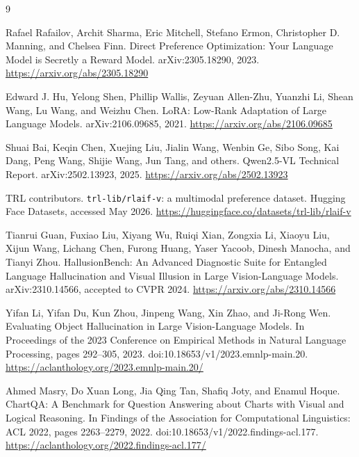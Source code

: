 \documentclass{article}
\begin{document}
\begin{thebibliography}{9}

Rafael Rafailov, Archit Sharma, Eric Mitchell, Stefano Ermon, Christopher D. Manning, and Chelsea Finn.
\newblock Direct Preference Optimization: Your Language Model is Secretly a Reward Model.
\newblock arXiv:2305.18290, 2023.
\newblock \url{https://arxiv.org/abs/2305.18290}

Edward J. Hu, Yelong Shen, Phillip Wallis, Zeyuan Allen-Zhu, Yuanzhi Li, Shean Wang, Lu Wang, and Weizhu Chen.
\newblock LoRA: Low-Rank Adaptation of Large Language Models.
\newblock arXiv:2106.09685, 2021.
\newblock \url{https://arxiv.org/abs/2106.09685}

Shuai Bai, Keqin Chen, Xuejing Liu, Jialin Wang, Wenbin Ge, Sibo Song, Kai Dang, Peng Wang, Shijie Wang, Jun Tang, and others.
\newblock Qwen2.5-VL Technical Report.
\newblock arXiv:2502.13923, 2025.
\newblock \url{https://arxiv.org/abs/2502.13923}

TRL contributors.
\newblock \texttt{trl-lib/rlaif-v}: a multimodal preference dataset.
\newblock Hugging Face Datasets, accessed May 2026.
\newblock \url{https://huggingface.co/datasets/trl-lib/rlaif-v}

Tianrui Guan, Fuxiao Liu, Xiyang Wu, Ruiqi Xian, Zongxia Li, Xiaoyu Liu, Xijun Wang, Lichang Chen, Furong Huang, Yaser Yacoob, Dinesh Manocha, and Tianyi Zhou.
\newblock HallusionBench: An Advanced Diagnostic Suite for Entangled Language Hallucination and Visual Illusion in Large Vision-Language Models.
\newblock arXiv:2310.14566, accepted to CVPR 2024.
\newblock \url{https://arxiv.org/abs/2310.14566}

Yifan Li, Yifan Du, Kun Zhou, Jinpeng Wang, Xin Zhao, and Ji-Rong Wen.
\newblock Evaluating Object Hallucination in Large Vision-Language Models.
\newblock In Proceedings of the 2023 Conference on Empirical Methods in Natural Language Processing, pages 292--305, 2023.
\newblock doi:10.18653/v1/2023.emnlp-main.20.
\newblock \url{https://aclanthology.org/2023.emnlp-main.20/}

Ahmed Masry, Do Xuan Long, Jia Qing Tan, Shafiq Joty, and Enamul Hoque.
\newblock ChartQA: A Benchmark for Question Answering about Charts with Visual and Logical Reasoning.
\newblock In Findings of the Association for Computational Linguistics: ACL 2022, pages 2263--2279, 2022.
\newblock doi:10.18653/v1/2022.findings-acl.177.
\newblock \url{https://aclanthology.org/2022.findings-acl.177/}

\end{thebibliography}
\end{document}
